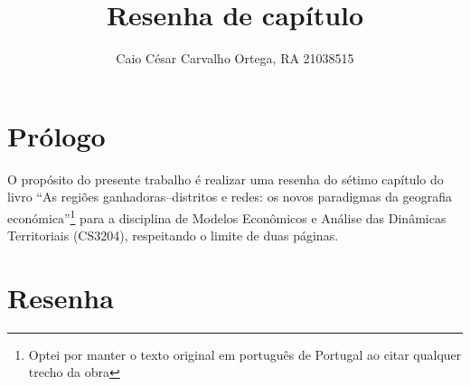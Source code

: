 \documentclass[hidelinks,a4paper,reprint,prl]{revtex4}
\begin{document}
	
	\title{Resenha de capítulo}
	
	
	
	
	\author{Caio César Carvalho Ortega, RA 21038515}
	
	
	\maketitle

	
	\section{Prólogo}
	
	O propósito do presente trabalho é realizar uma resenha do sétimo capítulo do livro ``As regiões ganhadoras–distritos e redes: os novos paradigmas da geografia económica''\footnote{Optei por manter o texto original em português de Portugal ao citar qualquer trecho da obra} para a disciplina de Modelos Econômicos e Análise das Dinâmicas Territoriais (CS3204), respeitando o limite de duas páginas.
	
	\section{Resenha}
	
\end{document}
